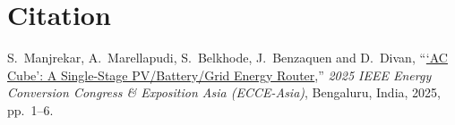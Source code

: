 \section{Citation}

S.~Manjrekar, A.~Marellapudi, S.~Belkhode, J.~Benzaquen and D.~Divan,
``\href{https://doi.org/10.1109/ECCE-Asia63110.2025.11111930}{`AC Cube': A
Single-Stage PV/Battery/Grid Energy Router},'' \textit{2025 IEEE Energy
Conversion Congress \& Exposition Asia (ECCE-Asia)}, Bengaluru, India, 2025,
pp.\ 1--6.


